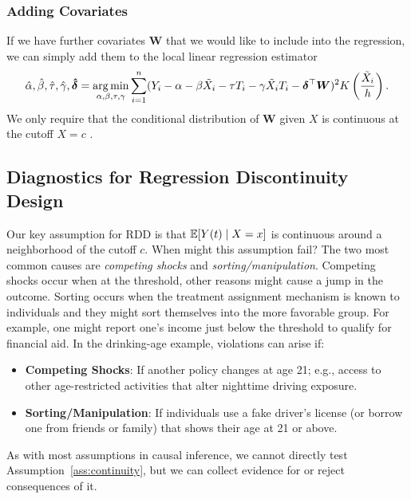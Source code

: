 \documentclass[11pt]{exam}
\begin{document}
\subsubsection{Adding Covariates}
If we have further covariates $\bm{W}$ that we would like to include into the regression, we can simply add them to the local linear regression estimator
\[
    \hat \alpha, \hat \beta, \hat \tau, \hat \gamma, \bm{\hat{\delta}} = \operatorname*{arg\,min}_{\alpha, \beta, \tau, \gamma} \sum_{i=1}^n (Y_i - \alpha - \beta \tilde X_i - \tau T_i - \gamma \tilde X_i T_i - \bm{\delta}^\top \bm{W})^2 K\left(\frac{\tilde X_i}{h}\right).
\]
We only require that the conditional distribution of $\bm{W}$ given $X$ is continuous at the cutoff $X = c$ \citep{imbens2008regression}.

\subsection{Diagnostics for Regression Discontinuity Design}
Our key assumption for RDD is that $\mathbb{E}[Y(t) \mid X = x]$ is continuous around a neighborhood of the cutoff $c$. When might this assumption fail? The two most common causes are \emph{competing shocks} and \emph{sorting/manipulation}. Competing shocks occur when at the threshold, other reasons might cause a jump in the outcome. Sorting occurs when the treatment assignment mechanism is known to individuals and they might sort themselves into the more favorable group. For example, one might report one's income just below the threshold to qualify for financial aid.
In the drinking-age example, violations can arise if:
\begin{itemize}
    \item \textbf{Competing Shocks}: 
    If another policy changes at age 21; e.g., access to other age-restricted activities that alter nighttime driving exposure.
    \item \textbf{Sorting/Manipulation}: If individuals use a fake driver's license (or borrow one from friends or family) that shows their age at 21 or above.
\end{itemize}

As with most assumptions in causal inference, we cannot directly test Assumption~\ref{ass:continuity}, but we can collect evidence for or reject consequences of it.
\end{document}
